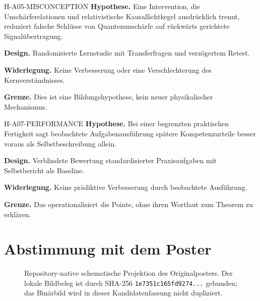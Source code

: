 \documentclass[11pt,a4paper]{article}
\begin{document}
\begin{boundarybox}{H-A05-MISCONCEPTION}
\textbf{Hypothese.} Eine Intervention, die Unschärferelationen und relativistische Kausallichtkegel ausdrücklich trennt, reduziert falsche Schlüsse von Quantenunschärfe auf rückwärts gerichtete Signalübertragung.\par
\textbf{Design.} Randomisierte Lernstudie mit Transferfragen und verzögertem Retest.\par
\textbf{Widerlegung.} Keine Verbesserung oder eine Verschlechterung des Kernverständnisses.\par
\textbf{Grenze.} Dies ist eine Bildungshypothese, kein neuer physikalischer Mechanismus.
\end{boundarybox}

\begin{boundarybox}{H-A07-PERFORMANCE}
\textbf{Hypothese.} Bei einer begrenzten praktischen Fertigkeit sagt beobachtete Aufgabenausführung spätere Kompetenzurteile besser voraus als Selbstbeschreibung allein.\par
\textbf{Design.} Verblindete Bewertung standardisierter Praxisaufgaben mit Selbstbericht als Baseline.\par
\textbf{Widerlegung.} Keine prädiktive Verbesserung durch beobachtete Ausführung.\par
\textbf{Grenze.} Das operationalisiert die Pointe, ohne ihren Wortlaut zum Theorem zu erklären.
\end{boundarybox}

\section{Abstimmung mit dem Poster}
\begin{figure}[htbp]
\centering
{}
\caption{Repository-native schematische Projektion des Originalposters. Der lokale Bildbeleg ist durch SHA-256 \texttt{1e7351c165fd9274...} gebunden; das Binärbild wird in dieser Kandidatenfassung nicht dupliziert.}
\end{figure}
\end{document}
